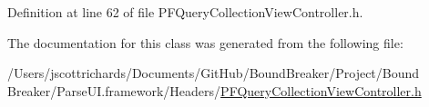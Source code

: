Definition at line 62 of file P\+F\+Query\+Collection\+View\+Controller.\+h.



The documentation for this class was generated from the following file\+:\begin{DoxyCompactItemize}
\item 
/\+Users/jscottrichards/\+Documents/\+Git\+Hub/\+Bound\+Breaker/\+Project/\+Bound Breaker/\+Parse\+U\+I.\+framework/\+Headers/\hyperlink{_p_f_query_collection_view_controller_8h}{P\+F\+Query\+Collection\+View\+Controller.\+h}\end{DoxyCompactItemize}
